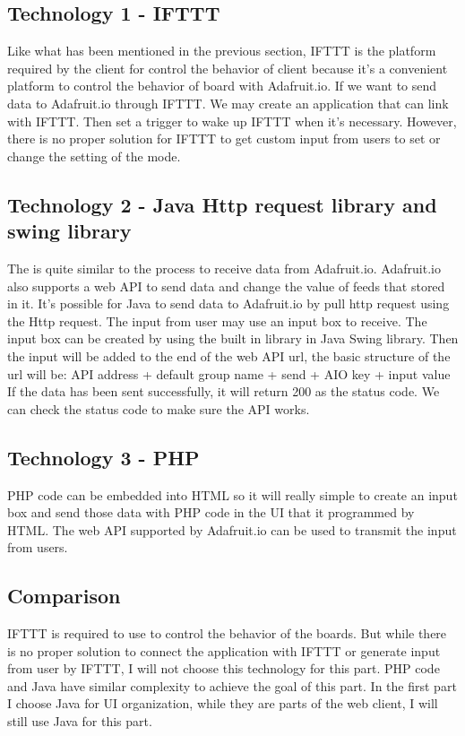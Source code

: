 \documentclass[10pt,onecolumn,journal,draftclsnofoot]{IEEEtran}
\begin{document}
	\subsection{Technology 1 - IFTTT}
	\par
	Like what has been mentioned in the previous section, IFTTT is the platform required by the client for control the behavior of client because it’s a convenient platform to control the behavior of board with Adafruit.io. If we want to send data to Adafruit.io through IFTTT. We may create an application that can link with IFTTT. Then set a trigger to wake up IFTTT when it’s necessary. However, there is no proper solution for IFTTT to get custom input from users to set or change the setting of the mode. 
    \subsection{Technology 2 - Java Http request library and swing library }
	\par 
	The is quite similar to the process to receive data from Adafruit.io. Adafruit.io also supports a web API to send data and change the value of feeds that stored in it. It’s possible for Java to send data to Adafruit.io by pull http request using the Http request. The input from user may use an input box to receive. The input box can be created by using the built in library in Java Swing library. Then the input will be added to the end of the web API url, the basic structure of the url will be:
	  API address + default group name + send + AIO key + input value     
	If the data has been sent successfully, it will return 200 as the status code. We can check the status code to make sure the API works.

	\subsection{Technology 3 - PHP}
    \par 
  	PHP code can be embedded into HTML so it will really simple to create an input box and send those data with PHP code in the UI that it programmed by HTML. The web API supported by Adafruit.io can be used to transmit the input from users.
    \subsection{Comparison}
    \par 
    IFTTT is required to use to control the behavior of the boards. But while there is no proper solution to connect the application with IFTTT or generate input from user by IFTTT, I will not choose this technology for this part. PHP code and Java have similar complexity to achieve the goal of this part. In the first part I choose Java for UI organization, while they are parts of the web client, I will still use Java for this part.
    
\end{document}
